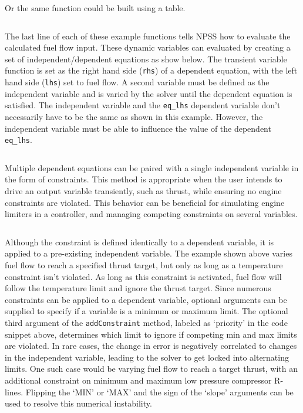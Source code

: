 \documentclass[heading.tex]{subfiles}
\begin{document}
\begin{adjustwidth}{-1cm}{-1cm}
 \inputminted[]{c++}{code/rampFn}
 \end{adjustwidth} 
 
Or the same function could be built using a table. 
 
 \begin{adjustwidth}{-1cm}{-1cm}
 \inputminted[]{c++}{code/rampTb}
 \end{adjustwidth} 

The last line of each of these example functions tells NPSS how to evaluate the calculated fuel flow input.
These dynamic variables can evaluated by creating a set of independent/dependent equations as show below.
The transient variable function is set as the right hand side (\texttt{rhs}) of a dependent equation,
with the left hand side (\texttt{lhs}) set to fuel flow. 
A second variable must be defined as the independent variable and is varied by the solver until the dependent
equation is satisfied.
The independent variable and the \texttt{eq\_lhs} dependent variable don't necessarily have to be the same
as shown in this example. However, the independent variable must be able to influence the
value of the dependent \texttt{eq\_lhs}.

 \begin{adjustwidth}{1cm}{-1cm}
 \inputminted[]{c++}{code/solverSetup}
 \end{adjustwidth} 


Multiple dependent equations can be paired with a single independent variable in the form of constraints.
This method is appropriate when the user intends to drive an output variable transiently,
such as thrust, while ensuring no engine constraints are violated.
This behavior can be beneficial for simulating engine limiters in a controller, and managing 
competing constraints on several variables.
 
 \begin{adjustwidth}{1cm}{-1cm}
 \inputminted[]{c++}{code/constraintSetup}
 \end{adjustwidth} 
 
Although the constraint is defined identically to a dependent variable, it is applied to a pre-existing independent variable.
The example shown above varies fuel flow to reach a specified thrust target, but only as long as a temperature constraint isn't violated.
As long as this constraint is activated, fuel flow will follow the temperature limit and ignore the thrust target.
Since numerous constraints can be applied to a dependent variable,
optional arguments can be supplied to specify if a variable is a minimum or maximum limit.
The optional third argument of the \texttt{addConstraint} method, labeled as `priority' in the code snippet above,
determines which limit to ignore if competing min and max limits are violated.
In rare cases, the change in error is negatively correlated to changes in the independent variable,
leading to the solver to get locked into alternating limits. One such case would be varying fuel flow to reach a target thrust,
with an additional constraint on minimum and maximum low pressure compressor R-lines.
Flipping the `MIN' or `MAX' and the sign of the `slope' arguments can be used to resolve this numerical instability.
\end{document}

